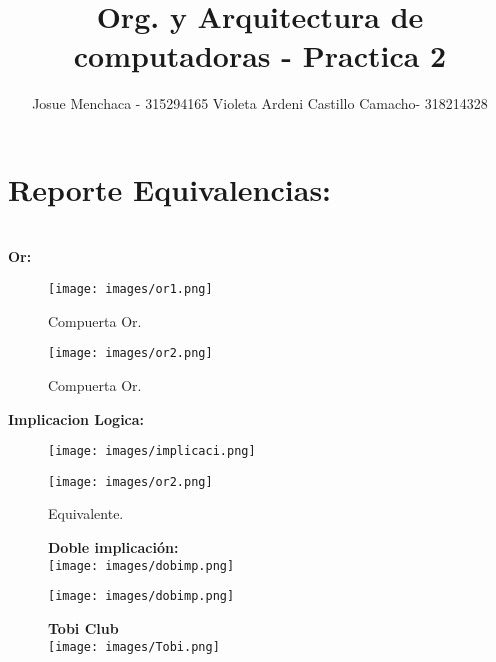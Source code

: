 \documentclass{article}
\title{Org. y Arquitectura de computadoras - Practica 2}
\author{
    Josue Menchaca - 315294165
    Violeta Ardeni Castillo Camacho- 318214328
}
\begin{document}
\maketitle

\section*{Reporte Equivalencias: }
\\

\textbf{Or: }

\begin{figure}[h] %
    \centering
    \texttt{[image: images/or1.png]} %
    \caption{Compuerta Or.} %
    \label{fig:example} %

    \texttt{[image: images/or2.png]} %
    \caption{Compuerta Or.} %
    
\end{figure}

\textbf{Implicacion Logica: }

\begin{figure}[h] %
    \centering
   
  \texttt{[image: images/implicaci.png]} %

    \texttt{[image: images/or2.png]} %
    \caption{Equivalente.} %
\end{figure}


\begin{figure}\textbf{Doble implicación:}\\
    \centering
   \texttt{[image: images/dobimp.png]}
\end{figure}
\begin{figure}

    \centering
   \texttt{[image: images/dobimp.png]}
\end{figure}


\begin{figure}\textbf{Tobi Club}\\
    \centering
   \texttt{[image: images/Tobi.png]}
\end{figure}
\end{document}
